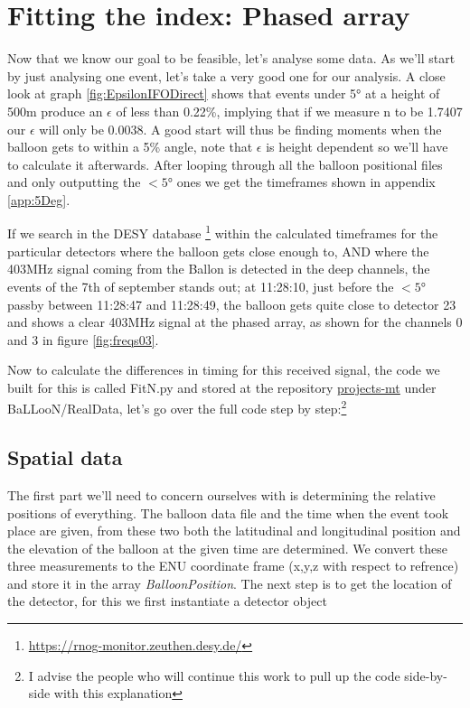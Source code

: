 \documentclass[11pt,a4paper,faculty=we,language=en,doctype=report]{cls/ugent-doc}
\begin{document}
\section{Fitting the index: Phased array}
Now that we know our goal to be feasible, let's analyse some data.  As we'll
start by just analysing one event, let's take a very good one for our analysis.
A close look at graph \ref{fig:EpsilonIFODirect} shows that events under 5° at
a height of 500m produce an $\epsilon$ of less than 0.22\%, implying that if we
measure n to be 1.7407 our $\epsilon$ will only be 0.0038.  A good start will
thus be finding moments when the balloon gets to within a 5\% angle, note that
$\epsilon$ is height dependent so we'll have to calculate it afterwards.  After
looping through all the balloon positional files and only outputting the $<5°$
ones we get the timeframes shown in appendix \ref{app:5Deg}.

If we search in the DESY database
\footnote{\url{https://rnog-monitor.zeuthen.desy.de/}} within the calculated
timeframes for the particular detectors where the balloon gets close enough to,
AND where the 403MHz signal coming from the Ballon is detected in the deep channels, the events of the 7th
of september stands out; at 11:28:10,  just before the $<5°$ passby between
11:28:47 and 11:28:49, the balloon gets quite close to detector 23 and shows a
clear 403MHz signal at the phased array, as shown for the channels 0 and 3 in
figure \ref{fig:freqs03}.

Now to calculate the differences in timing for this received signal, the code
we built for this is called FitN.py and stored at the repository
\href{https://github.com/arthuradriaens-code/projects-mt.git}{projects-mt}
under BaLLooN/RealData, let's go over the full code step by step:\footnote{I advise 
the people who will continue this work to pull up the code side-by-side with this 
explanation}

\subsection{Spatial data}
The first part we'll need to concern ourselves with is determining the relative
positions of everything. The balloon data file and the time when the event took
place are given, from these two both the latitudinal and longitudinal position
and the elevation of the balloon at the given time are determined. We convert
these three measurements to the ENU coordinate frame (x,y,z with respect to
refrence) and store it in the array \textit{BalloonPosition}. The next step is
to get the location of the detector, for this we first instantiate a detector
object 
\end{document}
